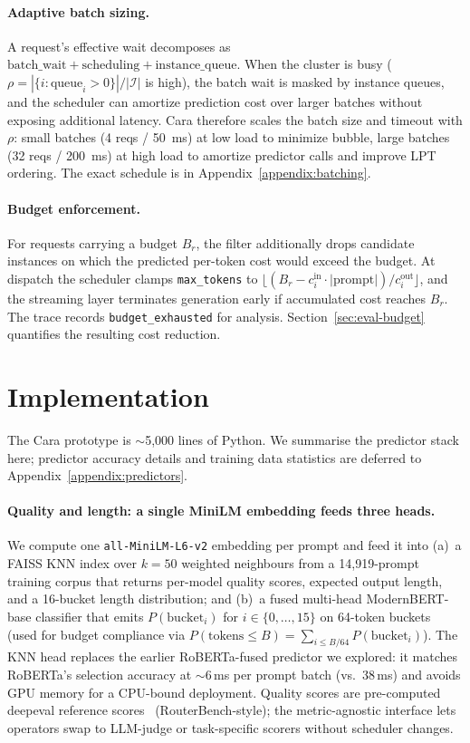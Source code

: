 \documentclass[10pt]{article}
\begin{document}
\paragraph{Adaptive batch sizing.}
A request's effective wait decomposes as $\text{batch\_wait} + \text{scheduling} + \text{instance\_queue}$. When the cluster is busy ($\rho = |\{i : \text{queue}_i > 0\}| / |\mathcal{I}|$ is high), the batch wait is masked by instance queues, and the scheduler can amortize prediction cost over larger batches without exposing additional latency. Cara therefore scales the batch size and timeout with $\rho$: small batches (4 reqs / 50~ms) at low load to minimize bubble, large batches (32 reqs / 200~ms) at high load to amortize predictor calls and improve LPT ordering. The exact schedule is in Appendix~\ref{appendix:batching}.

\paragraph{Budget enforcement.}
For requests carrying a budget $B_r$, the filter additionally drops candidate instances on which the predicted per-token cost would exceed the budget. At dispatch the scheduler clamps \texttt{max\_tokens} to $\lfloor (B_r - c^{\text{in}}_i \cdot |\text{prompt}|)/c^{\text{out}}_i \rfloor$, and the streaming layer terminates generation early if accumulated cost reaches $B_r$. The trace records \texttt{budget\_exhausted} for analysis. Section~\ref{sec:eval-budget} quantifies the resulting cost reduction.

\section{Implementation}\label{sec:impl}

The Cara prototype is $\sim$5{,}000 lines of Python. We summarise the predictor stack here; predictor accuracy details and training data statistics are deferred to Appendix~\ref{appendix:predictors}.

\paragraph{Quality and length: a single MiniLM embedding feeds three heads.}
We compute one \texttt{all-MiniLM-L6-v2} embedding per prompt and feed it into (a)~a FAISS KNN index over $k{=}50$ weighted neighbours from a 14{,}919-prompt training corpus that returns per-model quality scores, expected output length, and a 16-bucket length distribution; and (b)~a fused multi-head ModernBERT-base classifier that emits $P(\text{bucket}_i)$ for $i \in \{0,\ldots,15\}$ on 64-token buckets (used for budget compliance via $P(\text{tokens} \le B) = \sum_{i \le B/64} P(\text{bucket}_i)$). The KNN head replaces the earlier RoBERTa-fused predictor we explored: it matches RoBERTa's selection accuracy at \(\sim\)6\,ms per prompt batch (vs.\ 38\,ms) and avoids GPU memory for a CPU-bound deployment. Quality scores are pre-computed deepeval reference scores~\cite{deepeval} (RouterBench-style); the metric-agnostic interface lets operators swap to LLM-judge or task-specific scorers without scheduler changes.
\end{document}
